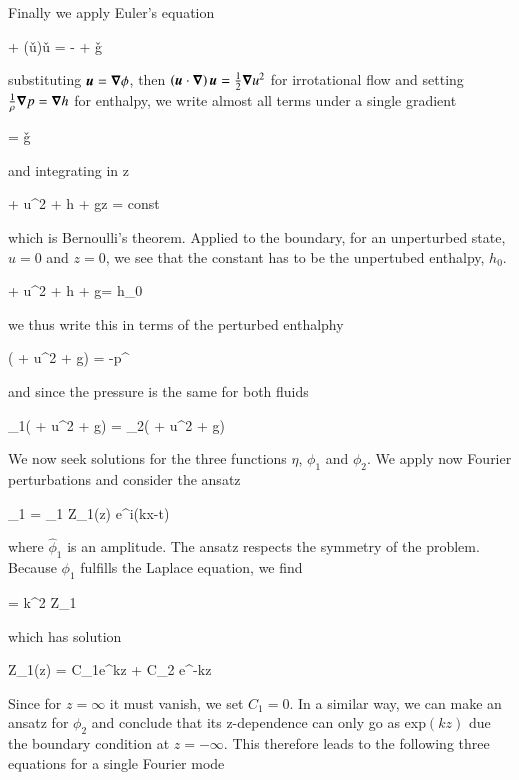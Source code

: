 Finally we apply Euler's equation

\beq
{} + \left(\v{u}\cdot\grad\right)\v{u} = - + \v{g} 
\eeq

substituting ${\boldsymbol{u}}={\boldsymbol{\nabla}}{\phi}$, then $\left({\boldsymbol{u}}\cdot{\boldsymbol{\nabla}}\right){\boldsymbol{u}} = \frac{1}{2}{\boldsymbol{\nabla}}{u^2}$
for irrotational flow and setting $\frac{1}{\rho}{\boldsymbol{\nabla}}{p}={\boldsymbol{\nabla}}{h}$ for
enthalpy, we write almost all terms under a single gradient


\beq
{} = \v{g} 
\eeq

and integrating in z

\beq
{} +  u^2 + h + gz = {\rm const}
\eeq

which is Bernoulli's theorem. Applied to the boundary, for an unperturbed state, $u=0$ and $z=0$, we
see that the constant has to be the unpertubed enthalpy, $h_0$. 

\beq
{} +  u^2 + h + g\eta = h_0
\eeq

we thus write this in terms of the perturbed enthalphy

\beq
\rho\left( +  u^2 + g\eta\right) = -p^\prime
\eeq

and since the pressure is the same for both fluids

\beq
\rho_1\left( +  u^2 + g\eta\right) = \rho_2\left( +  u^2 + g\eta\right)
\label{eq:bernoulli-boundary}
\eeq



We now seek solutions for the three functions $\eta$, $\phi_1$ and
$\phi_2$. We apply now Fourier perturbations and consider the ansatz

\beq
\phi_1 = \hat{\phi}_1 Z_1(z) e^{i\left(kx-\omega t\right)}
\eeq

where $\hat{\phi}_1$ is an amplitude.  The ansatz
respects the symmetry of the problem. Because $\phi_1$ fulfills
the Laplace equation, we find

\beq
{} = k^2 Z_1
\eeq

which has solution

\beq
Z_1(z) = C_1e^{kz} + C_2 e^{-kz}  
\eeq

Since for $z=\infty$ it must vanish, we set $C_1=0$. In a similar way, we can make an
ansatz for $\phi_2$ and conclude that its z-dependence can only go as
exp$(kz)$ due the boundary condition at $z=-\infty$.
This therefore leads to the following three equations for a single Fourier mode


